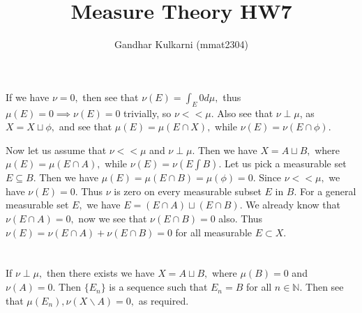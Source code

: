 \documentclass{article}
\title{Measure Theory HW7} %
\author{Gandhar Kulkarni (mmat2304)} %
\date{} %
\begin{document}
\maketitle %


\section{} %
If we have $\nu=0,$ then see that $\nu(E)=\int_{E}0 d\mu,$ thus $\mu(E)=0 \implies \nu(E)=0$ trivially, so $\nu << \mu.$ Also see that $\nu \perp \mu$, as 
$X= X \sqcup \phi,$ and see that $\mu(E)=\mu(E \cap X),$ while $\nu(E)=\nu(E \cap \phi).$ 

Now let us assume that $\nu << \mu$ and $\nu \perp \mu.$ Then we have $X=A \sqcup B,$ where $\mu(E)=\mu(E \cap A),$ while $\nu(E)=\nu(E \int B).$ Let us 
pick a measurable set $E \subseteq B.$ Then we have $\mu(E)=\mu(E \cap B)=\mu(\phi)=0.$ Since $\nu << \mu,$ we have $\nu(E)=0.$ Thus $\nu$ is zero on every 
measurable subset $E$ in $B.$ For a general measurable set $E,$ we have $E=(E \cap A) \sqcup (E \cap B).$ We already know that $\nu(E\cap A)=0,$ now we see 
that $\nu(E \cap B)=0$ also. Thus $\nu(E)=\nu(E \cap A)+\nu(E \cap B)=0$ for all measurable $E \subset X.$
\section{} %
If $\nu \perp \mu,$ then there exists we have $X=A \sqcup B,$ where $\mu(B)=0$ and $\nu(A)=0.$ Then $\{E_n\}$ is a sequence such that $E_n=B$ for all $n \in 
\mathbb{N}.$ Then see that $\mu(E_n), \nu(X\backslash A)=0,$ as required.
\end{document}
